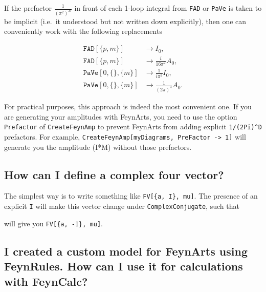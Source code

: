 \documentclass[../FeynCalcManual.tex]{subfiles}
\begin{document}
If the prefactor \(\frac{1}{(\pi^2)^D}\) in front of each 1-loop
integral from \texttt{FAD} or \texttt{PaVe} is taken to be implicit
(i.e.~it understood but not written down explicitly), then one can
conveniently work with the following replacements

\begin{align*}
\mathtt{FAD}[\{p,m\}] &\to I_0, \\
\mathtt{FAD}[\{p,m\}] &\to \frac{i}{16 \pi^2} A_0, \\
\mathtt{PaVe}[0, \{\}, \{m\}] &\to \frac{1}{i \pi^2} I_0, \\
\mathtt{PaVe}[0, \{\}, \{m\}] &\to \frac{1}{(2 \pi)^4} A_0.
\end{align*}

For practical purposes, this approach is indeed the most convenient one.
If you are generating your amplitudes with FeynArts, you need to use the
option \texttt{Prefactor} of \texttt{CreateFeynAmp} to prevent FeynArts
from adding explicit \texttt{1/(2Pi)^D} prefactors. For example,
\texttt{CreateFeynAmp[\allowbreak{}myDiagrams,\ \allowbreak{}PreFactor -> 1]}
will generate you the amplitude (I*M) without those prefactors.

\hypertarget{how-can-i-define-a-complex-four-vector}{%
\subsection{How can I define a complex four
vector?}\label{how-can-i-define-a-complex-four-vector}}

The simplest way is to write something like
\texttt{FV[\allowbreak{}\{\allowbreak{}a,\ \allowbreak{}I\},\ \allowbreak{}mu]}.
The presence of an explicit \texttt{I} will make this vector change
under \texttt{ComplexConjugate}, such that

\begin{Shaded}
\begin{Highlighting}[]
\OperatorTok{[}\OperatorTok{[\{}\OperatorTok{,}\OperatorTok{\},}\OperatorTok{]]}\SpecialCharTok{//}
\end{Highlighting}
\end{Shaded}

will give you
\texttt{FV[\allowbreak{}\{\allowbreak{}a,\ \allowbreak{}-I\},\ \allowbreak{}mu]}.

\hypertarget{i-created-a-custom-model-for-feynarts-using-feynrules.-how-can-i-use-it-for-calculations-with-feyncalc}{%
\subsection{I created a custom model for FeynArts using FeynRules. How
can I use it for calculations with
FeynCalc?}\label{i-created-a-custom-model-for-feynarts-using-feynrules.-how-can-i-use-it-for-calculations-with-feyncalc}}
\end{document}
